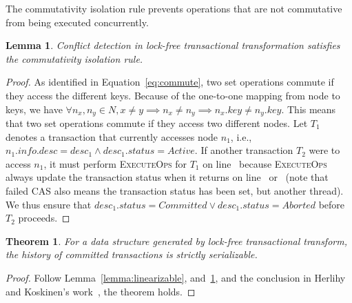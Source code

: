 \documentclass{sig-alternate-05-2015}
\newtheorem{theorem}{Theorem}
\newtheorem{lemma}{Lemma}
\begin{document}
The commutativity isolation rule prevents operations that are not commutative from being executed concurrently.
\begin{lemma}
    \label{lemma:commute}
    Conflict detection in lock-free transactional transformation satisfies the commutativity isolation rule.
\end{lemma}
\begin{proof}
    As identified in Equation~\ref{eq:commute}, two set operations commute if they access the different keys.
    Because of the one-to-one mapping from node to keys, we have $\forall n_x,n_y \in N, x \ne y \implies n_x \ne n_y \implies n_x.key \ne n_y.key$. 
    This means that two set operations commute if they access two different nodes.
    Let $T_1$ denotes a transaction that currently accesses node $n_1$, i.e., $n_1.info.desc = desc_1 \land desc_1.status = Active$.
    If another transaction $T_2$ were to access $n_1$, it must perform \textsc{ExecuteOps} for $T_1$ on line~ because \textsc{ExecuteOps} always update the transaction status when it returns on line~ or~ (note that failed CAS also means the transaction status has been set, but another thread).
    We thus ensure that $desc_1.status = Committed \lor desc_1.status = Aborted$ before $T_2$ proceeds. 
\end{proof}

\begin{theorem}
    For a data structure generated by lock-free transactional transform, the history of committed transactions is strictly serializable.
\end{theorem}
\begin{proof}
Follow Lemma~\ref{lemma:linearizable}, and~\ref{lemma:commute}, and the conclusion in Herlihy and Koskinen's work~\cite{herlihy2008transactional}, the theorem holds.
\end{proof}
\end{document}

